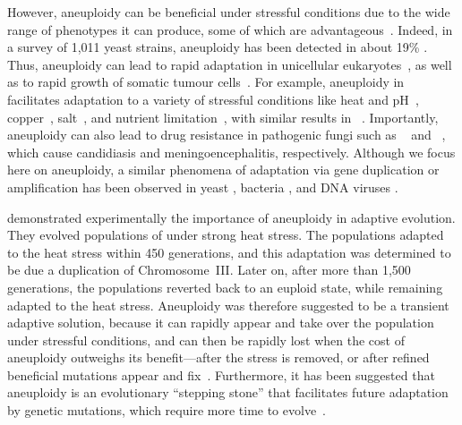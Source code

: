 \documentclass[12pt]{article}
\begin{document}
However, aneuploidy can be beneficial under stressful conditions due to the wide range of phenotypes it can produce, some of which are advantageous~\citep{Pavelka2010, Yang2021}.
Indeed, in a survey of 1,011 yeast strains, aneuploidy has been detected in about 19\% \citep{Peter2018}.
Thus, aneuploidy can lead to rapid adaptation in unicellular eukaryotes~\citep{Gerstein2015,Torres2010, Hong2014, Rancati2008}, as well as to rapid growth of somatic tumour cells~\citep{Schvartzman2010, Sheltzer2017}.
For example, aneuploidy in \yeast facilitates adaptation to a variety of stressful conditions like heat and pH~\citep{Yona2012}, copper~\citep{Covo2014, Gerstein2015}, salt~\citep{Dhar2011, Robinson2023}, and nutrient limitation~\citep{Dunham2002, Gresham2008, Avecilla2022}, with similar results in \calbicans~\citep{Yang2021}.
Importantly, aneuploidy can also lead to drug resistance in pathogenic fungi such as \calbicans~\citep{Selmecki2008, Selmecki2010, Gerstein2020} and \cneoformans~\citep{Sionov2010}, which cause candidiasis and meningoencephalitis, respectively.
Although we focus here on aneuploidy, a similar phenomena of adaptation via gene duplication or amplification has been observed in yeast \citep{Lauer2018}, bacteria \citep{Sonti1989}, and DNA viruses \citep{Elde2012}.

\citet{Yona2012} demonstrated experimentally the importance of aneuploidy in adaptive evolution. They evolved populations of \yeast under strong heat stress.
The populations adapted to the heat stress within 450 generations, and this adaptation was determined to be due a duplication of Chromosome~III.
Later on, after more than 1,500 generations, the populations reverted back to an euploid state, while remaining adapted to the heat stress. 
Aneuploidy was therefore suggested to be a transient adaptive solution, because it can rapidly appear and take over the population under stressful conditions, and can then be rapidly lost when the cost of aneuploidy outweighs its benefit---after the stress is removed, or after refined beneficial mutations appear and fix~\citep{Yona2012}.
Furthermore, it has been suggested that aneuploidy is an evolutionary ``stepping stone'' that facilitates future adaptation by genetic mutations, which require more time to evolve~\citep{Yona2012,Yona2015}.
\end{document}
